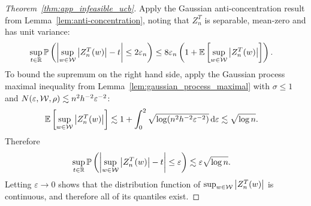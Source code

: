 \begin{proof}[Theorem~\ref{thm:app_infeasible_ucb}]
  Apply the Gaussian anti-concentration
  result from Lemma~\ref{lem:anti-concentration},
  noting that $Z_n^T$ is separable,
  mean-zero and has unit variance:
  \begin{align*}
    \sup_{t \in \mathbb{R}}
    \mathbb{P}\left(
      \left|
      \sup_{w \in \mathcal{W}}
      \big| Z_n^T(w) \big|
      - t
      \right|
      \leq 2\varepsilon_n
    \right)
    &\leq
    8 \varepsilon_n
    \left(
      1 + \mathbb{E}\left[
        \sup_{w \in \mathcal{W}}
        \big| Z_n^T(w) \big|
      \right]
    \right).
  \end{align*}
  To bound the supremum on the right hand side,
  apply the Gaussian process maximal inequality from
  Lemma~\ref{lem:gaussian_process_maximal}
  with
  $\sigma \leq 1$
  and
  $N(\varepsilon, \mathcal{W}, \rho) \lesssim n^2 h^{-2} \varepsilon^{-2}$:
  \begin{align*}
    \mathbb{E}\left[
      \sup_{w \in \mathcal{W}}
      \big|Z_n^T(w)\big|
    \right]
    &\lesssim
    1
    + \int_0^{2}
    \sqrt{\log (n^2 h^{-2} \varepsilon^{-2})}
    \,\mathrm{d}\varepsilon
    \lesssim
    \sqrt{\log n}.
  \end{align*}
  Therefore
  \begin{align*}
    \sup_{t \in \mathbb{R}}
    \mathbb{P}\left(
      \left|
      \sup_{w \in \mathcal{W}}
      \big| Z_n^T(w) \big|
      - t
      \right|
      \leq \varepsilon
    \right)
    &\lesssim
    \varepsilon
    \sqrt{\log n}.
  \end{align*}
  Letting $\varepsilon \to 0$
  shows that the distribution function of
  $\sup_{w \in \mathcal{W}} \big|Z_n^T(w)\big|$
  is continuous,
  and therefore all of its quantiles exist.



\end{proof}
